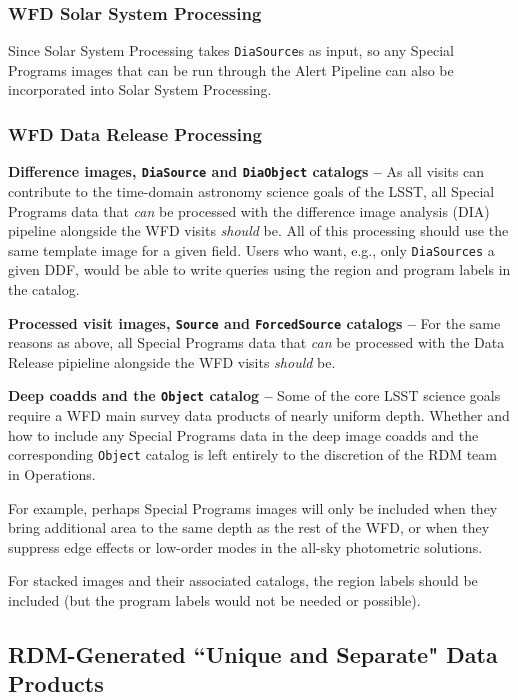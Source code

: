 \subsubsection{WFD Solar System Processing}

Since Solar System Processing takes {\tt DiaSource}s as input, so any 
Special Programs images that can be run through the Alert Pipeline can 
also be incorporated into Solar System Processing.


\subsubsection{WFD Data Release Processing}

\textbf{Difference images, {\tt DiaSource} and {\tt DiaObject} catalogs -- }
As all visits can contribute to the time-domain astronomy science goals 
of the LSST, all Special Programs data that {\it can} be processed with 
the difference image analysis (DIA) pipeline alongside the WFD visits 
{\it should} be.
All of this processing should use the same template image for a given
field.
Users who want, e.g., only {\tt DiaSources} a given DDF, would be 
able to write queries using the region and program labels in the catalog.

\textbf{Processed visit images, {\tt Source} and {\tt ForcedSource} catalogs -- }
For the same reasons as above, all Special Programs data that 
{\it can} be processed with the Data Release pipieline alongside the WFD 
visits {\it should} be.

\textbf{Deep coadds and the {\tt Object} catalog -- }
Some of the core LSST science goals require a WFD main survey data 
products of nearly uniform depth.
Whether and how to include any Special Programs data in the deep image 
coadds and the corresponding {\tt Object} catalog is left entirely to the 
discretion of the RDM team in Operations.

For example, perhaps Special Programs images will only be included when 
they bring additional area to the same depth as the rest of the WFD, or 
when they suppress edge effects or low-order modes in the 
all-sky photometric solutions.

For stacked images and their associated catalogs, the region labels should be
included (but the program labels would not be needed or possible).


\subsection{RDM-Generated ``Unique and Separate" Data Products}\label{ssec:proc_rdm}

